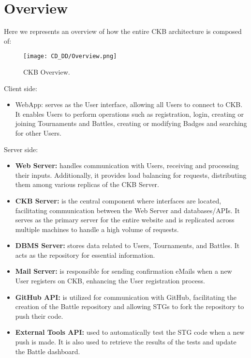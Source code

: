 \section{Overview}
\label{sec:overview}%
Here we represents an overview of how the entire CKB architecture is composed of:

\begin{figure}[H]
    \begin{center}
        \texttt{[image: CD\_DD/Overview.png]}
        \caption{CKB Overview.}
        \label{fig:CKB_overview}%
    \end{center}
\end{figure}

\noindent Client side:
\begin{itemize}
    \item WebApp: serves as the User interface, allowing all Users to connect to CKB. It enables Users to perform operations such as registration, login, creating or joining Tournaments and Battles, creating or modifying Badges and searching for other Users.
\end{itemize}
\noindent Server side:
\begin{itemize}
    \item \textbf{Web Server:} handles communication with Users, receiving and processing their inputs. Additionally, it provides load balancing for requests, distributing them among various replicas of the CKB Server.
    \item \textbf{CKB Server:} is the central component where interfaces are located, facilitating communication between the Web Server and databases/APIs. It serves as the primary server for the entire website and is replicated across multiple machines to handle a high volume of requests.
    \item \textbf{DBMS Server:} stores data related to Users, Tournaments, and Battles. It acts as the repository for essential information.
    \item \textbf{Mail Server:} is responsible for sending confirmation eMails when a new User registers on CKB, enhancing the User registration process.
    \item \textbf{GitHub API:} is utilized for communication with GitHub, facilitating the creation of the Battle repository and allowing STGs to fork the repository to push their code.
    \item \textbf{External Tools API:} used to automatically test the STG code when a new push is made. It is also used to retrieve the results of the tests and update the Battle dashboard.
\end{itemize}

